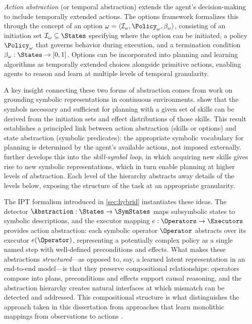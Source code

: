 \emph{Action abstraction} (or temporal abstraction) extends the agent's decision-making to include temporally extended actions. The options framework \citep{sutton1999options} formalizes this through the concept of an option $\omega = \langle \mathcal{I}_\omega, \Policy_\omega, \beta_\omega \rangle$, consisting of an initiation set $\mathcal{I}_\omega \subseteq \States$ specifying where the option can be initiated, a policy $\Policy_\omega$ that governs behavior during execution, and a termination condition $\beta_\omega : \States \rightarrow [0,1]$. Options can be incorporated into planning and learning algorithms as temporally extended choices alongside primitive actions, enabling agents to reason and learn at multiple levels of temporal granularity.

A key insight connecting these two forms of abstraction comes from work on grounding symbolic representations in continuous environments. \citet{konidaris2018skills} show that the symbols necessary and sufficient for planning with a given set of skills can be derived from the initiation sets and effect distributions of those skills. This result establishes a principled link between action abstraction (skills or options) and state abstraction (symbolic predicates): the appropriate symbolic vocabulary for planning is determined by the agent's available actions, not imposed externally. \citet{konidaris2016constructing} further develops this into the \emph{skill-symbol loop}, in which acquiring new skills gives rise to new symbolic representations, which in turn enable planning at higher levels of abstraction. Each level of the hierarchy abstracts away details of the levels below, exposing the structure of the task at an appropriate granularity.

The IPT formalism introduced in \cref{sec:hybrid} instantiates these ideas. The detector $\Abstraction : \States \rightarrow \SymStates$ maps subsymbolic states to symbolic descriptions, and the executor mapping $e : \Operators \rightarrow \Executors$ provides action abstraction: each symbolic operator $\Operator$ abstracts over its executor $e(\Operator)$, representing a potentially complex policy as a single named step with well-defined preconditions and effects. What makes these abstractions \emph{structured}---as opposed to, say, a learned latent representation in an end-to-end model---is that they preserve compositional relationships: operators compose into plans, preconditions and effects support causal reasoning, and the abstraction hierarchy creates natural interfaces at which mismatch can be detected and addressed. This compositional structure is what distinguishes the approach taken in this dissertation from approaches that learn monolithic mappings from observations to actions \citep{konidaris2019necessity}.


